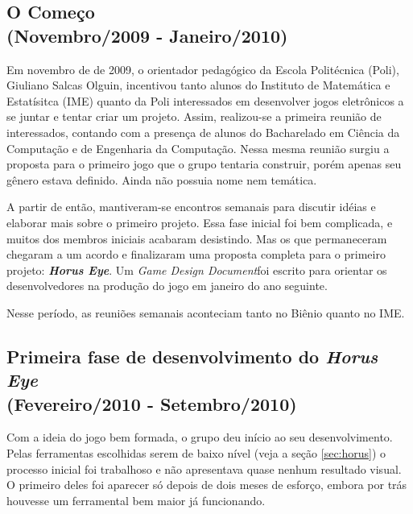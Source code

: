\documentclass[12pt,onecolumn,a4paper]{article}
\begin{document}
    \subsection{O Começo \\ {\small(Novembro/2009 - Janeiro/2010)}}
        Em novembro de de 2009, o orientador pedagógico da Escola Politécnica (Poli), Giuliano
        Salcas Olguin, incentivou tanto alunos do Instituto de Matemática e Estatísitca (IME) quanto
        da Poli interessados em desenvolver jogos eletrônicos a se juntar e tentar criar um projeto.
        Assim, realizou-se a primeira reunião de interessados, contando com a presença de alunos do
        Bacharelado em Ciência da Computação e de Engenharia da Computação. Nessa mesma reunião
        surgiu a proposta para o primeiro jogo que o grupo tentaria construir, porém apenas seu
        gênero estava definido. Ainda não possuia nome nem temática.

        A partir de então, mantiveram-se encontros semanais para discutir idéias e elaborar mais
        sobre o primeiro projeto. Essa fase inicial foi bem complicada, e muitos dos membros
        iniciais acabaram desistindo. Mas os que permaneceram chegaram a um acordo e finalizaram uma
        proposta completa para o primeiro projeto: \textit{\textbf{Horus Eye}}. Um \textit{Game
        Design Document}\footnotemark foi escrito para orientar os desenvolvedores na produção do
        jogo em janeiro do ano seguinte.
        
        Nesse período, as reuniões semanais aconteciam tanto no Biênio quanto no IME.
        

    \clearpage
    \subsection{Primeira fase de desenvolvimento do \textit{\textbf{Horus Eye}} \\
                {\small(Fevereiro/2010 - Setembro/2010)} }
        Com a ideia do jogo bem formada, o grupo deu início ao seu desenvolvimento. Pelas
        ferramentas escolhidas serem de baixo nível (veja a seção \ref{sec:horus}) o processo
        inicial foi trabalhoso e não apresentava quase nenhum resultado visual. O primeiro deles foi
        aparecer só depois de dois meses de esforço, embora por trás houvesse um ferramental bem
        maior já funcionando.
        
\end{document}
